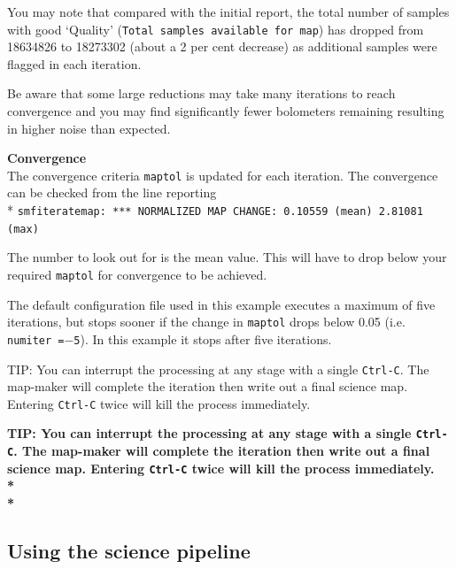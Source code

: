 \documentclass[twoside,11pt]{article}
\newenvironment{latexonly}{}{}
\newcommand{\xlabel}[1]{}
\renewcommand{\_}{\texttt{\symbol{95}}}
\newenvironment{fmpage}[1]{\begin{lrbox}{\fmbox}\begin{minipage}{#1}}{\end{minipage}\end{lrbox}\fbox{\usebox{\fmbox}}}
\newcommand{\param}[1]{\texttt{#1}}
\begin{document}
You may note that compared with the initial report, the total number of samples
with good `Quality' (\texttt{Total samples available for map}) has
dropped from 18634826 to 18273302 (about a 2 per cent decrease) as
additional samples were flagged in each iteration.

Be aware that some large reductions may take many iterations to reach
convergence and you may find significantly fewer bolometers remaining
resulting in higher noise than expected.

\textbf{Convergence}\\
The convergence criteria \param{maptol} is updated for each
iteration. The convergence can be checked from the line reporting\\*
\hspace*{0.5cm} \texttt{smf\_iteratemap: *** NORMALIZED MAP CHANGE:
0.10559 (mean) 2.81081 (max)}

The number to look out for is the mean value. This will have to drop
below your required \param{maptol} for convergence to be achieved.

The default configuration file used in this example executes a maximum
of five iterations, but stops sooner if the change in \param{maptol}
drops below 0.05 (i.e. \param{numiter~=$-$5}). In this example it
stops after five iterations.

\begin{latexonly}
\begin{center}
\begin{fmpage}{0.95\linewidth}
\vspace{0.1cm}
TIP: You can interrupt the processing at any stage with a
single \texttt{Ctrl-C}. The map-maker will complete the iteration then write
out a final science map. Entering \texttt{Ctrl-C} twice will
kill the process immediately.
\end{fmpage}
\end{center}
\end{latexonly}

\begin{htmlonly}
\textbf{TIP: You can interrupt the processing at any stage with a
single \texttt{Ctrl-C}. The map-maker will complete the iteration then write
out a final science map. Entering \texttt{Ctrl-C} twice  will
kill the process immediately.\\*\\*}
\end{htmlonly}

\subsection{\xlabel{sciencepl}Using the science pipeline}
\end{document}

